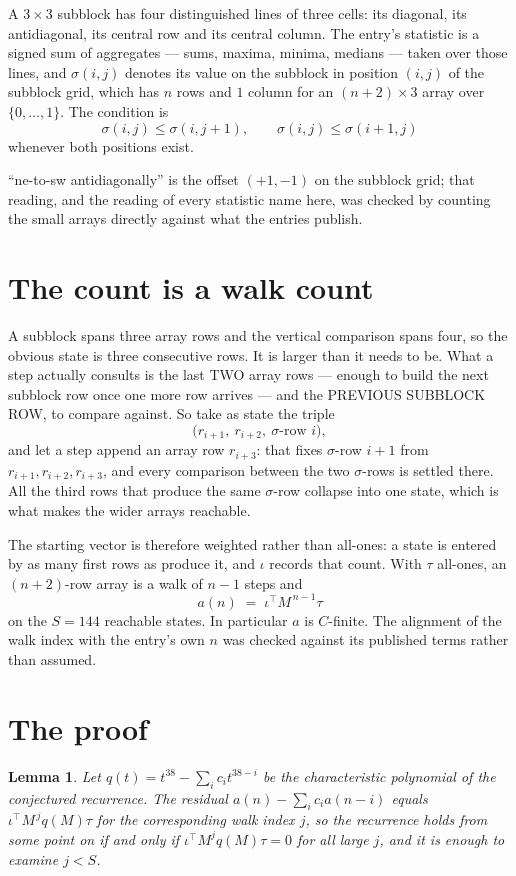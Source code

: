 \documentclass[11pt,a4paper]{article}
\theoremstyle{plain}
\newtheorem{lemma}[theorem]{Lemma}
\theoremstyle{definition}
\begin{document}
A $3\times3$ subblock has four distinguished lines of three cells: its diagonal, its
antidiagonal, its central row and its central column. The entry's statistic is a signed sum of
aggregates --- sums, maxima, minima, medians --- taken over those lines, and $\sigma(i,j)$
denotes its value on the subblock in position $(i,j)$ of the subblock grid, which has $n$ rows
and $1$ column for an $(n+2)\times3$ array over $\{0,\dots,1\}$. The condition is
\[
\sigma(i,j)\le\sigma(i,j+1),\qquad \sigma(i,j)\le\sigma(i+1,j)
\]
whenever both positions exist.

``ne-to-sw antidiagonally'' is the offset $(+1,-1)$ on the subblock grid; that reading, and
the reading of every statistic name here, was checked by counting the small arrays directly
against what the entries publish.

\section{The count is a walk count}

A subblock spans three array rows and the vertical comparison spans four, so the obvious state
is three consecutive rows. It is larger than it needs to be. What a step actually consults is
the last TWO array rows --- enough to build the next subblock row once one more row arrives ---
and the PREVIOUS SUBBLOCK ROW, to compare against. So take as state the triple
\[
\bigl(r_{i+1},\ r_{i+2},\ \sigma\text{-row }i\bigr),
\]
and let a step append an array row $r_{i+3}$: that fixes $\sigma$-row $i+1$ from
$r_{i+1},r_{i+2},r_{i+3}$, and every comparison between the two $\sigma$-rows is settled
there. All the third rows that produce the same $\sigma$-row collapse into one state, which is
what makes the wider arrays reachable.

The starting vector is therefore weighted rather than all-ones: a state is entered by as many
first rows as produce it, and $\iota$ records that count. With $\tau$ all-ones, an
$(n+2)$-row array is a walk of $n-1$ steps and
\[
a(n)\;=\;\iota^{\!\top}M^{\,n-1}\tau
\]
on the $S=144$ reachable states. In particular $a$ is $C$-finite. The alignment of the walk
index with the entry's own $n$ was checked against its published terms rather than assumed.

\section{The proof}

\begin{lemma}\label{lem:crit}
Let $q(t)=t^{38}-\sum_i c_it^{38-i}$ be the characteristic polynomial of the
conjectured recurrence. The residual $a(n)-\sum_ic_ia(n-i)$ equals
$\iota^{\!\top}M^{\,j}q(M)\tau$ for the corresponding walk index $j$, so the recurrence
holds from some point on if and only if $\iota^{\!\top}M^{j}q(M)\tau=0$ for all large $j$,
and it is enough to examine $j<S$.
\end{lemma}
\end{document}
